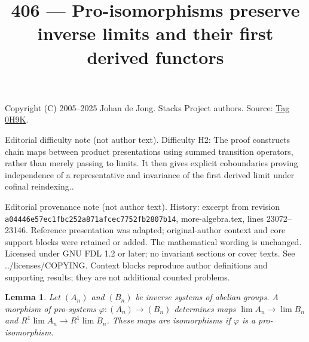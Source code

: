 \documentclass{amsart}
\theoremstyle{plain}
\newtheorem{lemma}[subsection]{Lemma}
\theoremstyle{definition}
\theoremstyle{remark}
\numberwithin{equation}{subsection}
\def\lim{\mathop{\mathrm{lim}}\nolimits}
\begin{document}
\title[Stacks Project, Tag 0H9K]{406 --- Pro-isomorphisms preserve inverse limits and their first derived functors}
\maketitle
\noindent Copyright (C) 2005--2025 Johan de Jong. Stacks Project authors. Source: \href{https://stacks.math.columbia.edu/tag/0H9K}{Tag 0H9K}.

\noindent Editorial difficulty note (not author text). Difficulty H2: The proof constructs chain maps between product presentations using summed transition operators, rather than merely passing to limits. It then gives explicit coboundaries proving independence of a representative and invariance of the first derived limit under cofinal reindexing..

\noindent Editorial provenance note (not author text). History: excerpt from revision \texttt{a0444\allowbreak 6e57e\allowbreak c1fbc\allowbreak 252a8\allowbreak 71afc\allowbreak ec775\allowbreak 2fb28\allowbreak 07b14}, more-algebra.tex, lines 23072--23146. Reference presentation was adapted; original-author context and core support blocks were retained or added. The mathematical wording is unchanged. Licensed under GNU FDL 1.2 or later; no invariant sections or cover texts. See ../licenses/COPYING. Context blocks reproduce author definitions and supporting results; they are not additional counted problems.

\begin{lemma}
\label{lemma-pro-isomorphism-iso-Rlim}
Let $(A_n)$ and $(B_n)$ be inverse systems of abelian groups.
A morphism of pro-systems $\varphi : (A_n) \to (B_n)$ determines
maps $\lim A_n \to \lim B_n$ and $R^1\lim A_n \to R^1\lim B_n$.
These maps are isomorphisms if $\varphi$ is a pro-isomorphism.
\end{lemma}
\end{document}

